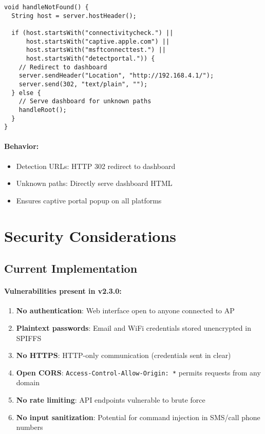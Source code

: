 \documentclass[11pt,a4paper]{article}
\begin{document}
\begin{verbatim}
void handleNotFound() {
  String host = server.hostHeader();
  
  if (host.startsWith("connectivitycheck.") || 
      host.startsWith("captive.apple.com") ||
      host.startsWith("msftconnecttest.") || 
      host.startsWith("detectportal.")) {
    // Redirect to dashboard
    server.sendHeader("Location", "http://192.168.4.1/");
    server.send(302, "text/plain", "");
  } else {
    // Serve dashboard for unknown paths
    handleRoot();
  }
}
\end{verbatim}

\paragraph{Behavior:}
\begin{itemize}[leftmargin=*]
  \item Detection URLs: HTTP 302 redirect to dashboard
  \item Unknown paths: Directly serve dashboard HTML
  \item Ensures captive portal popup on all platforms
\end{itemize}

\section{Security Considerations}

\subsection{Current Implementation}

\paragraph{Vulnerabilities present in v2.3.0:}
\begin{enumerate}[leftmargin=*]
  \item \textbf{No authentication}: Web interface open to anyone connected to AP
  \item \textbf{Plaintext passwords}: Email and WiFi credentials stored unencrypted in SPIFFS
  \item \textbf{No HTTPS}: HTTP-only communication (credentials sent in clear)
  \item \textbf{Open CORS}: \texttt{Access-Control-Allow-Origin: *} permits requests from any domain
  \item \textbf{No rate limiting}: API endpoints vulnerable to brute force
  \item \textbf{No input sanitization}: Potential for command injection in SMS/call phone numbers
\end{enumerate}
\end{document}

